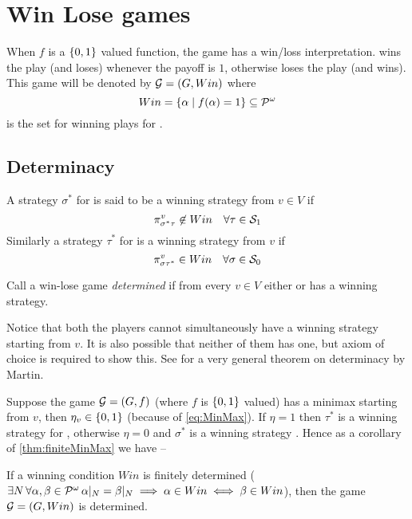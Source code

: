 \section{Win Lose games}
\label{sec:winlose}
When $f$ is a $\left\{0,1\right\}$ valued function, the game has a win/loss interpretation.  wins the play (and  loses) whenever the payoff is $1$, otherwise  loses the play (and  wins). This game will be denoted by $\mathcal{G}=(G,Win)$ where
\[
Win = \left\{ \alpha \mid f(\alpha) = 1\right\} \subseteq \mathcal{P}^\omega
\]
is the set for winning plays for .

\subsection{Determinacy}
A strategy $\sigma^*$ for  is said to be a winning strategy from $v \in V$ if
\[
    \pi^v_{\sigma^*\tau} \not\in Win \quad \forall \tau \in \mathcal{S}_1
\]
Similarly a strategy $\tau^*$ for  is a winning strategy from $v$ if
\[
    \pi^v_{\sigma\tau^*} \in Win \quad \forall \sigma \in \mathcal{S}_0
\]

\begin{definition}
\label{def:determinacy}
Call a win-lose game \emph{determined} if from every $v \in V$ either  or  has a winning strategy.
\end{definition}

Notice that both the players cannot simultaneously have a winning strategy starting from $v$. It is also possible that neither of them has one, but axiom of choice is required to show this. See \cite{martin_borel_1975} for a very general theorem on determinacy by Martin.

Suppose the game $\mathcal{G}=(G,f)$ (where $f$ is $\left\{0,1\right\}$ valued) has a minimax \eqminmax starting from $v$, then $\eta_v \in \left\{0,1\right\}$ (because of \eqref{eq:MinMax}). If $\eta=1$ then $\tau^*$ is a winning strategy for , otherwise $\eta=0$ and $\sigma^*$ is a winning strategy . Hence as a corollary of \autoref{thm:finiteMinMax} we have --
\begin{corollary}
    \label{cor:finiteDeterminacy}
    If a winning condition $Win$ is finitely determined ($\exists N \, \forall \alpha,\beta \in \mathcal{P}^\omega \, \alpha|_N = \beta|_N \implies \alpha \in Win \iff \beta \in Win$), then the game $\mathcal{G}=(G,Win)$ is determined.
\end{corollary}
